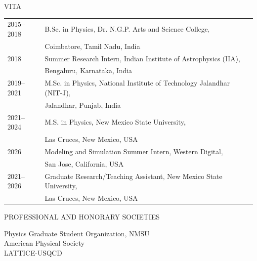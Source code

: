 \begin{center}
    VITA
\end{center}

\begin{flushleft}
\begin{tabular}{ll}
2015--2018 & B.Sc. in Physics, Dr. N.G.P. Arts and Science College, \\
           & Coimbatore, Tamil Nadu, India \\[10pt]
           
2018 & Summer Research Intern, Indian Institute of Astrophysics (IIA), \\
           & Bengaluru, Karnataka, India \\[10pt]

2019--2021 & M.Sc. in Physics, National Institute of Technology Jalandhar (NIT-J), \\
           & Jalandhar, Punjab, India \\[10pt]

2021--2024 & M.S. in Physics, New Mexico State University, \\
           & Las Cruces, New Mexico, USA \\[10pt]

2026       & Modeling and Simulation Summer Intern, Western Digital, \\
           & San Jose, California, USA \\[10pt]

2021--2026 & Graduate Research/Teaching Assistant, New Mexico State University, \\
           & Las Cruces, New Mexico, USA \\
\end{tabular}
\end{flushleft}

\vspace{0.1in}
\begin{center}
PROFESSIONAL AND HONORARY SOCIETIES
\end{center}
\begin{flushleft}
Physics Graduate Student Organization, NMSU\\
American Physical Society\\
LATTICE-USQCD
\end{flushleft}

